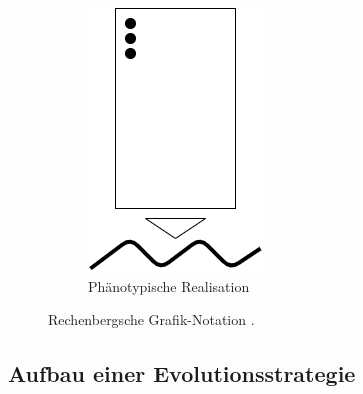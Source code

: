 \begin{figure}[!htb]
\begin{subfigure}{.3\textwidth}
	\centering
	\includegraphics[width=.5\linewidth]{img/rechenberg_notation/phaenotypische_realisation.png}
	\caption{Phänotypische Realisation}
	\label{fig:phaenotypische_realisation}
\end{subfigure}
\caption{Rechenbergsche Grafik-Notation \cite[S. 145]{schoeneburg}.}
\label{fig:rechenberg}
\end{figure}


\subsection{Aufbau einer Evolutionsstrategie}

